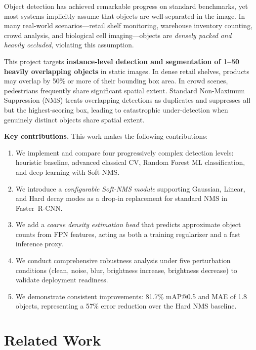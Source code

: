 \documentclass[conference]{IEEEtran}
\begin{document}
Object detection has achieved remarkable progress on standard benchmarks,
yet most systems implicitly assume that objects are well-separated in the
image. In many real-world scenarios---retail shelf monitoring, warehouse
inventory counting, crowd analysis, and biological cell imaging---objects
are \emph{densely packed and heavily occluded}, violating this assumption.

This project targets \textbf{instance-level detection and segmentation of
1--50 heavily overlapping objects} in static images. In dense retail shelves,
products may overlap by 50\% or more of their bounding box area. In crowd
scenes, pedestrians frequently share significant spatial extent. Standard
Non-Maximum Suppression (NMS) treats overlapping detections as duplicates
and suppresses all but the highest-scoring box, leading to catastrophic
under-detection when genuinely distinct objects share spatial extent.

\textbf{Key contributions.} This work makes the following contributions:
\begin{enumerate}
  \item We implement and compare four progressively complex detection
    levels: heuristic baseline, advanced classical CV, Random Forest ML
    classification, and deep learning with Soft-NMS.
  \item We introduce a \emph{configurable Soft-NMS module} supporting
    Gaussian, Linear, and Hard decay modes as a drop-in replacement for
    standard NMS in Faster~R-CNN.
  \item We add a \emph{coarse density estimation head} that predicts
    approximate object counts from FPN features, acting as both a
    training regularizer and a fast inference proxy.
  \item We conduct comprehensive robustness analysis under five
    perturbation conditions (clean, noise, blur, brightness increase,
    brightness decrease) to validate deployment readiness.
  \item We demonstrate consistent improvements: 81.7\% mAP@0.5 and
    MAE of 1.8 objects, representing a 57\% error reduction over
    the Hard NMS baseline.
\end{enumerate}

\section{Related Work}
\label{sec:related}
\end{document}
